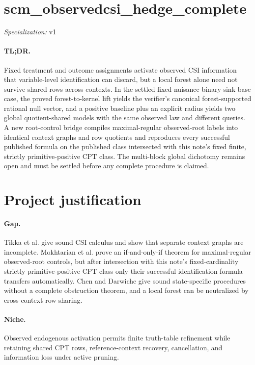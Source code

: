 \documentclass{article}
\begin{document}
\sloppy

\section*{scm\_\allowbreak{}observedcsi\_\allowbreak{}hedge\_\allowbreak{}complete}

\noindent\textit{Specialization:} v1\par

\paragraph{TL;DR.} Fixed treatment and outcome assignments activate observed CSI information that variable-level identification can discard, but a local forest alone need not survive shared rows across contexts. In the settled fixed-nuisance binary-sink base case, the proved forest-to-kernel lift yields the verifier's canonical forest-supported rational null vector, and a positive baseline plus an explicit radius yields two global quotient-shared models with the same observed law and different queries. A new root-control bridge compiles maximal-regular observed-root labels into identical context graphs and row quotients and reproduces every successful published formula on the published class intersected with this note's fixed finite, strictly primitive-positive CPT class. The multi-block global dichotomy remains open and must be settled before any complete procedure is claimed.

\section{Project justification}

\paragraph{Gap.} Tikka et al. give sound CSI calculus and show that separate context graphs are incomplete. Mokhtarian et al. prove an if-and-only-if theorem for maximal-regular observed-root controls, but after intersection with this note's fixed-cardinality strictly primitive-positive CPT class only their successful identification formula transfers automatically. Chen and Darwiche give sound state-specific procedures without a complete obstruction theorem, and a local forest can be neutralized by cross-context row sharing.

\paragraph{Niche.} Observed endogenous activation permits finite truth-table refinement while retaining shared CPT rows, reference-context recovery, cancellation, and information loss under active pruning.
\end{document}

